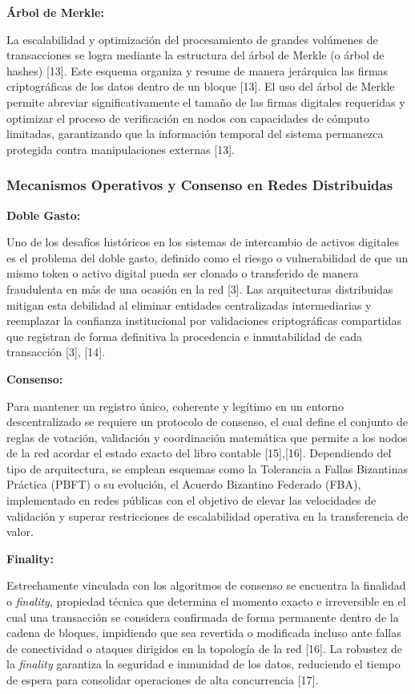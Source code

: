 \documentclass[12pt,a4paper]{article}
\begin{document}
\textbf{Árbol de Merkle:}

La escalabilidad y optimización del procesamiento de grandes volúmenes de transacciones se logra mediante la estructura del árbol de Merkle (o árbol de hashes) [13]. Este esquema organiza y resume de manera jerárquica las firmas criptográficas de los datos dentro de un bloque [13]. El uso del árbol de Merkle permite abreviar significativamente el tamaño de las firmas digitales requeridas y optimizar el proceso de verificación en nodos con capacidades de cómputo limitadas, garantizando que la información temporal del sistema permanezca protegida contra manipulaciones externas [13].

\subsubsection{Mecanismos Operativos y Consenso en Redes Distribuidas}

\textbf{Doble Gasto:}

Uno de los desafíos históricos en los sistemas de intercambio de activos digitales es el problema del doble gasto, definido como el riesgo o vulnerabilidad de que un mismo token o activo digital pueda ser clonado o transferido de manera fraudulenta en más de una ocasión en la red [3]. Las arquitecturas distribuidas mitigan esta debilidad al eliminar entidades centralizadas intermediarias y reemplazar la confianza institucional por validaciones criptográficas compartidas que registran de forma definitiva la procedencia e inmutabilidad de cada transacción [3], [14].

\textbf{Consenso:}

Para mantener un registro único, coherente y legítimo en un entorno descentralizado se requiere un protocolo de consenso, el cual define el conjunto de reglas de votación, validación y coordinación matemática que permite a los nodos de la red acordar el estado exacto del libro contable [15],[16]. Dependiendo del tipo de arquitectura, se emplean esquemas como la Tolerancia a Fallas Bizantinas Práctica (PBFT) o su evolución, el Acuerdo Bizantino Federado (FBA), implementado en redes públicas con el objetivo de elevar las velocidades de validación y superar restricciones de escalabilidad operativa en la transferencia de valor.

\textbf{Finality:}

Estrechamente vinculada con los algoritmos de consenso se encuentra la finalidad o \textit{finality}, propiedad técnica que determina el momento exacto e irreversible en el cual una transacción se considera confirmada de forma permanente dentro de la cadena de bloques, impidiendo que sea revertida o modificada incluso ante fallas de conectividad o ataques dirigidos en la topología de la red [16]. La robustez de la \textit{finality} garantiza la seguridad e inmunidad de los datos, reduciendo el tiempo de espera para consolidar operaciones de alta concurrencia [17].
\end{document}

